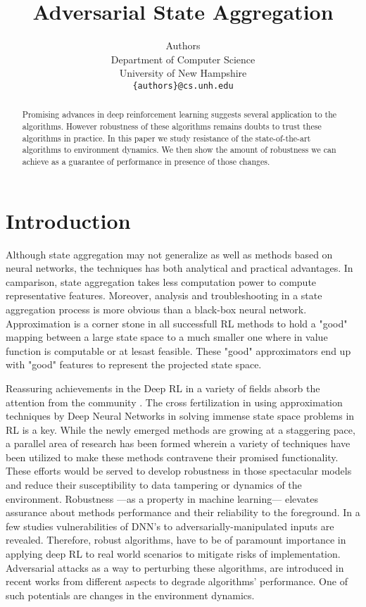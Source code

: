 \documentclass{article}
\title{Adversarial State Aggregation}
\author{%
Authors \\ %
Department of Computer Science\\
University of New Hampshire \\
\texttt{\{authors\}@cs.unh.edu} \\
}
\begin{document}
    \maketitle

    \begin{abstract}
        Promising advances in deep reinforcement learning suggests several application to the algorithms. However
        robustness of these algorithms remains doubts to trust these algorithms in practice. In this paper we study
        resistance of the state-of-the-art algorithms to environment dynamics. We then show the amount of robustness
        we can achieve as a guarantee of performance in presence of those changes.
    \end{abstract}


    \section{Introduction}
    Although state aggregation may not generalize as well as methods based on neural networks, the techniques has
    both analytical and practical advantages. In camparison, state aggregation takes less computation power to
    compute representative features. Moreover, analysis and troubleshooting in a state aggregation process is more
    obvious than a black-box neural network. Approximation is a corner stone in all successfull RL methods to hold a
    "good" mapping between a large state space to a much smaller one where in value function is computable or at
    lesast feasible. These "good" approximators end up with "good" features to represent the projected state space.

    Reassuring achievements in the Deep RL in a variety of fields absorb the attention from the community
    \citep{Mnih2015, schulman2015a, Lillicrap2015, silver2016a}. The cross
    fertilization in using approximation techniques by Deep Neural Networks in solving immense state space problems
    in RL is a key. While the newly emerged methods are growing at a staggering pace, a parallel area of research
    has been formed wherein a variety of techniques have been utilized to make these methods contravene their
    promised functionality. These efforts would be served to develop robustness in those spectacular models and
    reduce their susceptibility to data tampering or dynamics of the environment. Robustness ---as a property in
    machine learning--- elevates assurance about methods performance and their reliability to the foreground. In a
    few studies \cite{Goodfellow2014}  vulnerabilities of DNN's to adversarially-manipulated inputs are revealed.
    Therefore, robust algorithms, have to be of paramount importance in applying deep RL to real world scenarios to
    mitigate risks of implementation. Adversarial attacks as a way to perturbing these algorithms, are introduced in
    recent works \cite{Huang2017, Kos2017} from different aspects to degrade algorithms' performance. One of such
    potentials are changes in the environment dynamics.
\end{document}
